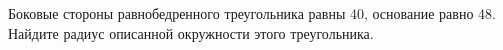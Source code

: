 \begin{ex}
	\begin{condition}
		Боковые стороны равнобедренного треугольника равны \( 40 \), основание равно \( 48 \). Найдите радиус описанной окружности этого треугольника.
	\end{condition}
\end{ex}